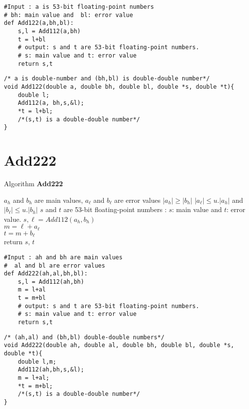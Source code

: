 \begin{lstlisting}
#Input : a is 53-bit floating-point numbers
# bh: main value and  bl: error value
def Add122(a,bh,bl):
    s,l = Add112(a,bh)
    t = l+bl
    # output: s and t are 53-bit floating-point numbers.
    # s: main value and t: error value
    return s,t
\end{lstlisting}

\begin{lstlisting}
/* a is double-number and (bh,bl) is double-double number*/
void Add122(double a, double bh, double bl, double *s, double *t){
    double l;
    Add112(a, bh,s,&l);
    *t = l+bl;
    /*(s,t) is a double-double number*/
}
\end{lstlisting}
\newpage

\section*{Add222}
\begin{algorithm}[htbp]
  \caption{Algorithm \textbf{Add222}}
\begin{algorithmic}[1]
\Input $a_h$ and $b_h$ are main values, $a_{\ell}$ and $b_{\ell}$ are error values
\Condition $\lvert a_h \rvert \ge \lvert b_h \rvert $
\Condition $\lvert a_{\ell} \rvert \le u. \lvert a_h \rvert$ and $\lvert b_{\ell} \rvert \le u. \lvert b_h \rvert$ 
\Output $s$ and $t$ are 53-bit floating-point numbers : $s$: main value and $t$: error value.
\State $s, \ell = Add112(a_h, b_h)$\\
    $m = \ell + a_{\ell}$ \\
    $t = m+b_{\ell}$\\
    return $s$, $t$
\end{algorithmic}
\label{algo:Add222}
\end{algorithm}

\begin{lstlisting}
#Input : ah and bh are main values
#  al and bl are error values
def Add222(ah,al,bh,bl):
    s,l = Add112(ah,bh)
    m = l+al
    t = m+bl
    # output: s and t are 53-bit floating-point numbers.
    # s: main value and t: error value
    return s,t
\end{lstlisting}

\begin{lstlisting}
/* (ah,al) and (bh,bl) double-double numbers*/
void Add222(double ah, double al, double bh, double bl, double *s, double *t){
    double l,m;
    Add112(ah,bh,s,&l);
    m = l+al;
    *t = m+bl;
    /*(s,t) is a double-double number*/
}
\end{lstlisting}
\newpage


